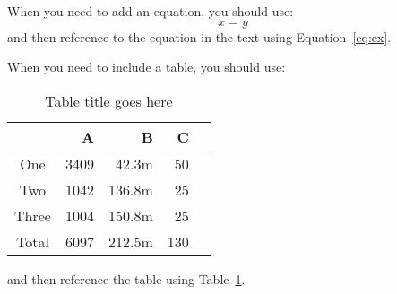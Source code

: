 When you need to add an equation, you should use:
\begin{equation}
   x=y
\label{eq:ex}
\end{equation}
and then reference to the equation in the text using Equation~\eqref{eq:ex}.

When you need to include a table, you should use:
\begin{table}[ht]
\centering %
\caption{\small Table title goes here} %
\begin{tabular}{c rrrr} %
\hline %
  & A & B & C\\
\hline %
One & 3409 & 42.3m & 50\\ %
Two & 1042 & 136.8m & 25\\
Three & 1004 & 150.8m & 25\\ %
\hline %
Total & 6097 & 212.5m & 130\\
\hline %
\end{tabular}
\label{tab:hresult}
\end{table}

and then reference the table using Table~\ref{tab:hresult}.
